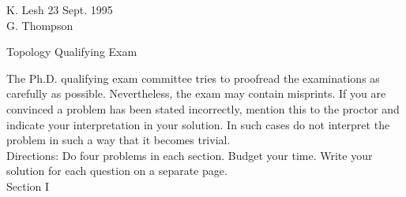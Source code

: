 


\noindent K. Lesh \hfill{23 Sept. 1995}\\
\noindent G. Thompson\\

\begin{center}
Topology Qualifying Exam
\end{center}

The Ph.D. qualifying exam committee tries to proofread the examinations as
carefully as possible.  Nevertheless, the exam may contain misprints.  If
you are convinced a problem has been stated incorrectly, mention this to the
proctor and indicate your interpretation in your solution. In such cases do not
interpret the problem in such a way that it becomes trivial.\\

\noindent Directions: Do four problems in each section. Budget your
time. Write your solution for each question on a separate page. \\

\noindent Section I
 
